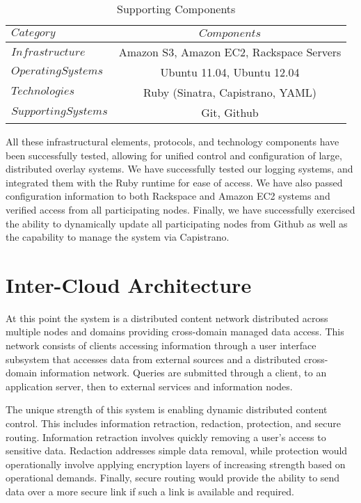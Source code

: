 \begin{table*}[tp] %
\centering %
\begin{tabular}{lc}
\toprule %
$Category$ 				& $Components$ 								\\\toprule %
$Infrastructure$ 		& Amazon S3, Amazon EC2, Rackspace Servers 	\\\midrule
$Operating Systems$		& Ubuntu 11.04, Ubuntu 12.04 				\\\midrule
$Technologies$			& Ruby (Sinatra, Capistrano, YAML) 			\\\midrule
$Supporting Systems$		& Git, Github 								\\\bottomrule
\end{tabular}
\caption{Supporting Components}
\label{table:model:components}
\end{table*}

All these infrastructural elements, protocols, and technology components have been successfully tested, allowing for unified control and configuration of large, distributed overlay systems.  We have successfully tested our logging systems, and integrated them with the Ruby runtime for ease of access.  We have also passed configuration information to both Rackspace and Amazon EC2 systems and verified access from all participating nodes.  Finally, we have successfully exercised the ability to dynamically update all participating nodes from Github as well as the capability to manage the system via Capistrano.

\section{Inter-Cloud Architecture}
At this point the system is a distributed content network distributed across multiple nodes and domains providing cross-domain managed data access.  This network consists of clients accessing information through a user interface subsystem that accesses data from external sources and a distributed cross-domain information network.  Queries are submitted through a client, to an application server, then to external services and information nodes.

The unique strength of this system is enabling dynamic distributed content control.  This includes information retraction, redaction, protection, and secure routing.  Information retraction involves quickly removing a user's access to sensitive data.  Redaction addresses simple data removal, while protection would operationally involve applying encryption layers of increasing strength based on operational demands.  Finally, secure routing would provide the ability to send data over a more secure link if such a link is available and required.

